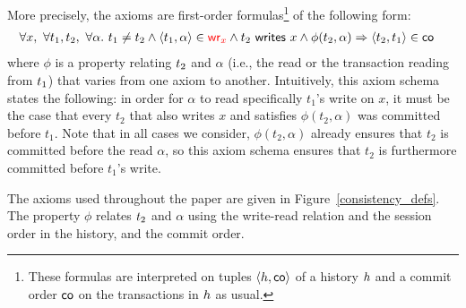 More precisely, the axioms are first-order formulas\footnote{These formulas are interpreted on tuples $\tup{\hist,\co}$ of a history $\hist$ and a commit order $\co$ on the transactions in $\hist$ as usual.} of the following form:
\begin{align*}
  & \forall \xvar,\ \forall \tr_1,\tr_2,\ \forall \alpha.\ \tr_1\neq \tr_2\land \tup{\tr_1,\alpha}\in \wro[\xvar] \land \writeVar{\tr_2}{\xvar} \land \phi(\tr_2,\alpha) \implies \tup{\tr_2,\tr_1}\in\co 
\end{align*}
where $\phi$ is a property relating $\tr_2$ and $\alpha$ (i.e., the read or the transaction reading from $\tr_1$) that varies from one axiom to another. Intuitively, this axiom schema states the following: in order for $\alpha$ to read specifically $t_1$'s write on $x$, it must be the case that every $t_2$ that also writes $x$ and satisfies $\phi(t_2,\alpha)$ was committed before $t_1$. Note that in all cases we consider, $\phi(t_2,\alpha)$ already ensures that $t_2$ is committed before the read $\alpha$, so this axiom schema ensures that $t_2$ is furthermore committed before $t_1$'s write.

The axioms used throughout the paper are given in Figure~\ref{consistency_defs}. The property $\phi$ relates $\tr_2$ and $\alpha$ using the write-read relation and the session order in the history, and the commit order. 


